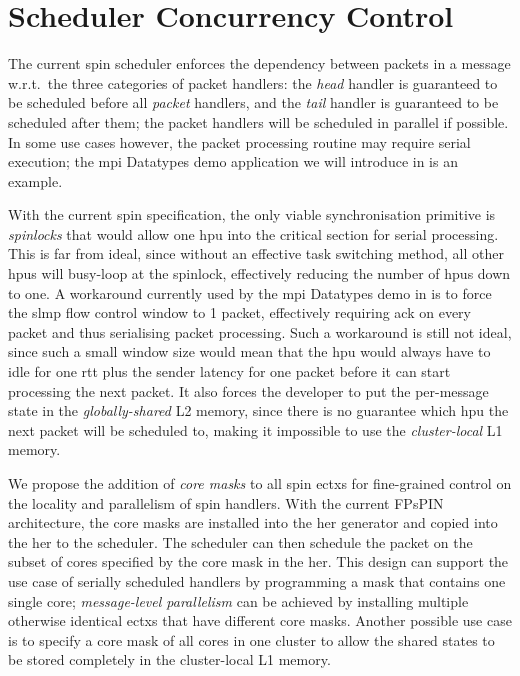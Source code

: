 \section{Scheduler Concurrency Control} \label{sec:sched-concurrency-ctrl}

The current \ac{spin} scheduler enforces the dependency between packets in a message w.r.t.\ the three categories of packet handlers: the \emph{head} handler is guaranteed to be scheduled before all \emph{packet} handlers, and the \emph{tail} handler is guaranteed to be scheduled after them; the packet handlers will be scheduled in parallel if possible.  In some use cases however, the packet processing routine may require serial execution; the \ac{mpi} Datatypes demo application we will introduce in  is an example.

With the current \ac{spin} specification, the only viable synchronisation primitive is \emph{spinlocks} that would allow one \ac{hpu} into the critical section for serial processing.  This is far from ideal, since without an effective task switching method, all other \ac{hpu}s will busy-loop at the spinlock, effectively reducing the number of \ac{hpu}s down to one.  A workaround currently used by the \ac{mpi} Datatypes demo in  is to force the \ac{slmp} flow control window to 1 packet, effectively requiring \ac{ack} on every packet and thus serialising packet processing.  Such a workaround is still not ideal, since such a small window size would mean that the \ac{hpu} would always have to idle for one \ac{rtt} plus the sender latency for one packet before it can start processing the next packet.  It also forces the developer to put the per-message state in the \emph{globally-shared} L2 memory, since there is no guarantee which \ac{hpu} the next packet will be scheduled to, making it impossible to use the \emph{cluster-local} L1 memory.

We propose the addition of \emph{core masks} to all \ac{spin} \ac{ectx}s for fine-grained control on the locality and parallelism of \ac{spin} handlers.  With the current FPsPIN architecture, the core masks are installed into the \ac{her} generator and copied into the \ac{her} to the scheduler.  The scheduler can then schedule the packet on the subset of cores specified by the core mask in the \ac{her}.  This design can support the use case of serially scheduled handlers by programming a mask that contains one single core; \emph{message-level parallelism} can be achieved by installing multiple otherwise identical \ac{ectx}s that have different core masks.  Another possible use case is to specify a core mask of all cores in one cluster to allow the shared states to be stored completely in the cluster-local L1 memory.

